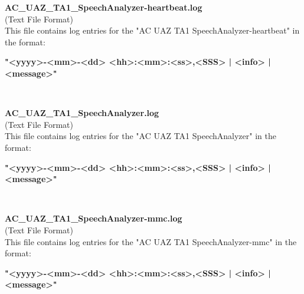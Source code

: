 \begin{description}
\begin{addmargin}[0em]{0em}
    \label{AC_UAZ_TA1_SpeechAnalyzer-heartbeat.log}
    \begin{addmargin}[1em]{0em} %
        \textbf{AC\_UAZ\_TA1\_SpeechAnalyzer-heartbeat.log}\\
        (Text File Format)\\
        This file contains log entries for the "AC UAZ TA1 SpeechAnalyzer-heartbeat" in the format:
        \begin{addmargin}[1em]{0em}
            \textbf{"<yyyy>-<mm>-<dd> <hh>:<mm>:<ss>,<SSS> | <info> | <message>"}
        \end{addmargin}
    \end{addmargin} %
    \textbf{\\}

    \label{AC_UAZ_TA1_SpeechAnalyzer.log}
    \begin{addmargin}[1em]{0em} %
        \textbf{AC\_UAZ\_TA1\_SpeechAnalyzer.log}\\
        (Text File Format)\\
        This file contains log entries for the "AC UAZ TA1 SpeechAnalyzer" in the format:
        \begin{addmargin}[1em]{0em}
            \textbf{"<yyyy>-<mm>-<dd> <hh>:<mm>:<ss>,<SSS> | <info> | <message>"}
        \end{addmargin}
    \end{addmargin} %
    \textbf{\\}

    \label{AC_UAZ_TA1_SpeechAnalyzer-mmc.log}
    \begin{addmargin}[1em]{0em} %
        \textbf{AC\_UAZ\_TA1\_SpeechAnalyzer-mmc.log}\\
        (Text File Format)\\
        This file contains log entries for the "AC UAZ TA1 SpeechAnalyzer-mmc" in the format:
        \begin{addmargin}[1em]{0em}
            \textbf{"<yyyy>-<mm>-<dd> <hh>:<mm>:<ss>,<SSS> | <info> | <message>"}
        \end{addmargin}
    \end{addmargin} %
    \textbf{\\}


\end{addmargin}
\end{description}
